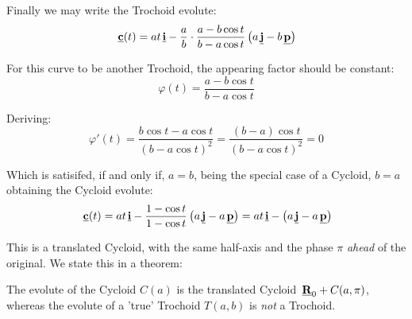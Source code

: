 Finally we may write the Trochoid evolute:
\[
  \hspace{0.05cm} \underline{\mathbf{c}}(t)
 = 
 at\hspace{0.05cm} \underline{\mathbf{i}}
 -
 \frac{a}{b}
 \cdot
 \frac{ 
    a-b \cos{t}
 }
 {
   b-a \cos{t}
 }
 \left(
    a \hspace{0.05cm} \underline{\mathbf{j}}
    -
    b \hspace{0.05cm} \underline{\mathbf{p}}
 \right)
\]

For this curve to be another Trochoid, the appearing factor should be constant:
\[
 \varphi(t)
 =
 \frac{ 
    a-b \cos{t}
 }
 {
   b-a \cos{t}
 }
\]

Deriving:
\[
 \varphi'(t)
 =
 \frac{ b \cos{t}- a \cos{t} }
 { (b-a \cos{t})^2}
 =
 \frac{ (b-a)\cos{t} }{ (b-a \cos{t})^2 }
 =
 0
\]

Which is satisifed, if and only if, $a=b$, being the special case of a Cycloid, $b=a$
obtaining the Cycloid evolute:
\[
  \hspace{0.05cm} \underline{\mathbf{c}}(t)
  =
  at\hspace{0.05cm} \underline{\mathbf{i}}
  -
   \frac{ 
    1- \cos{t}
 }
 {
   1- \cos{t}
 }
 \left(
    a \hspace{0.05cm} \underline{\mathbf{j}}
    -
    a \hspace{0.05cm} \underline{\mathbf{p}}
 \right)
 =
   at\hspace{0.05cm} \underline{\mathbf{i}}
  -
 \left(
    a \hspace{0.05cm} \underline{\mathbf{j}}
    -
    a \hspace{0.05cm} \underline{\mathbf{p}}
 \right)
\]

This is a translated Cycloid, with the same half-axis
and the phase $\pi$ \emph{ahead} of the original. 
We state this in a theorem:

\begin{Theorem}
 The evolute of the Cycloid $C(a)$ is the translated Cycloid $\hspace{0.05cm} \underline{\mathbf{R}}_0 + C(a,\pi)$,
 whereas the evolute of a 'true' Trochoid $T(a,b)$ is \emph{not} a Trochoid.
\end{Theorem}


